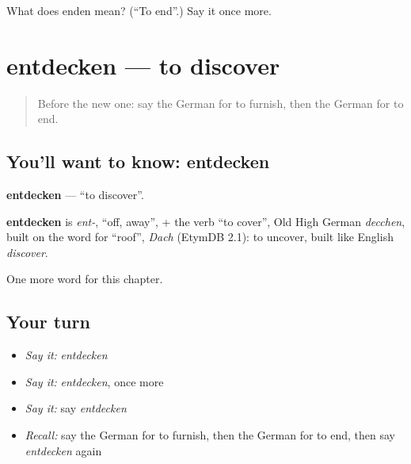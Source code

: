 \begin{tcolorbox}[breakable,colback=teal!4,colframe=teal!35!black,title={Before you move on}]
What does enden mean? (\textquotedblleft{}To end\textquotedblright{}.) Say it once more.
\end{tcolorbox}
\section[entdecken]{entdecken — to discover}

\label{lesson:GE-C248-entdecken}



\begin{quote}
Before the new one: say the German for to furnish, then the German for to end.
\end{quote}

\subsection*{You'll want to know: entdecken}
\textbf{entdecken} — \textquotedblleft{}to discover\textquotedblright{}.

\begin{cousinweb}
\textbf{entdecken} is \emph{ent-}, \textquotedblleft{}off, away\textquotedblright{}, + the verb \textquotedblleft{}to cover\textquotedblright{}, Old High German \emph{decchen}, built on the word for \textquotedblleft{}roof\textquotedblright{}, \emph{Dach} (EtymDB 2.1): to uncover, built like English \emph{discover}.
\end{cousinweb}

\begin{grammarlens}[title={What you've built}]
One more word for this chapter.
\end{grammarlens}

\subsection*{Your turn}
\begin{itemize}
\raggedright
  \item \emph{Say it:} \emph{entdecken}
  \item \emph{Say it:} \emph{entdecken}, once more
  \item \emph{Say it:} say \emph{entdecken}
  \item \emph{Recall:} say the German for to furnish, then the German for to end, then say \emph{entdecken} again
\end{itemize}

